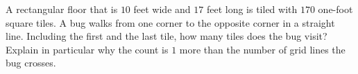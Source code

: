 A rectangular floor that is $10$ feet wide and $17$ feet long is tiled with $170$ one-foot square tiles. A bug walks from one corner to the opposite corner in a straight line. Including the first and the last tile, how many tiles does the bug visit? Explain in particular why the count is $1$ more than the number of grid lines the bug crosses.
